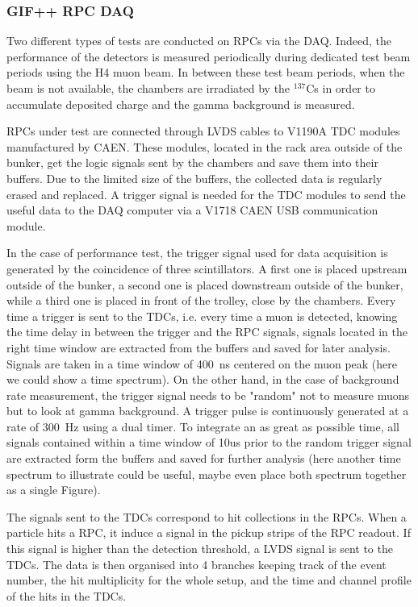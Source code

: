 			\subsubsection{\acs{GIF++} \acs{RPC} \acs{DAQ}}
            
			Two different types of tests are conducted on RPCs via the DAQ. Indeed, the performance of the detectors is measured periodically during dedicated test beam periods using the H4 muon beam. In between these test beam periods, when the beam is not available, the chambers are irradiated by the $^{137}$Cs in order to accumulate deposited charge and the gamma background is measured.

			RPCs under test are connected through LVDS cables to V1190A \acf{TDC} modules manufactured by CAEN. These modules, located in the rack area outside of the bunker, get the logic signals sent by the chambers and save them into their buffers. Due to the limited size of the buffers, the collected data is regularly erased and replaced. A trigger signal is needed for the TDC modules to send the useful data to the DAQ computer via a V1718 CAEN USB communication module.

			In the case of performance test, the trigger signal used for data acquisition is generated by the coincidence of three scintillators. A first one is placed upstream outside of the bunker, a second one is placed downstream outside of the bunker, while a third one is placed in front of the trolley, close by the chambers. Every time a trigger is sent to the TDCs, i.e. every time a muon is detected, knowing the time delay in between the trigger and the RPC signals, signals located in the right time window are extracted from the buffers and saved for later analysis. Signals are taken in a time window of \SI{400}{ns} centered on the muon peak (here we could show a time spectrum). On the other hand, in the case of background rate measurement, the trigger signal needs to be "random" not to measure muons but to look at gamma background. A trigger pulse is continuously generated at a rate of \SI{300}{Hz} using a dual timer. To integrate an as great as possible time, all signals contained within a time window of 10us prior to the random trigger signal are extracted form the buffers and saved for further analysis (here another time spectrum to illustrate could be useful, maybe even place both spectrum together as a single Figure).

			The signals sent to the TDCs correspond to hit collections in the RPCs. When a particle hits a RPC, it induce a signal in the pickup strips of the RPC readout. If this signal is higher than the detection threshold, a LVDS signal is sent to the TDCs. The data is then organised into 4 branches keeping track of the event number, the hit multiplicity for the whole setup, and the time and channel profile of the hits in the TDCs.

